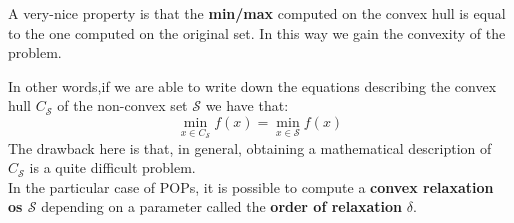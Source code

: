 A very-nice property is that the \textbf{min/max} computed on the convex hull is equal to the one computed on the original set. In this way we gain the convexity of the problem. 

In other words,if we are able to write down the equations describing the convex hull $C_\mathcal{S}$ of the non-convex set $\mathcal{S}$ we have that:
\begin{equation}
    \min_{x\in{C_\mathcal{S}}} f(x) = \min_{x\in\mathcal{S}} f(x)
\end{equation}
The drawback here is that, in general, obtaining a mathematical description of $C_\mathcal{S}$ is a quite difficult problem.\\
In the particular case of POPs, it is possible to compute a \textbf{convex relaxation os $\mathcal{S}$} depending on a parameter called the \textbf{order of relaxation} $\delta$.

